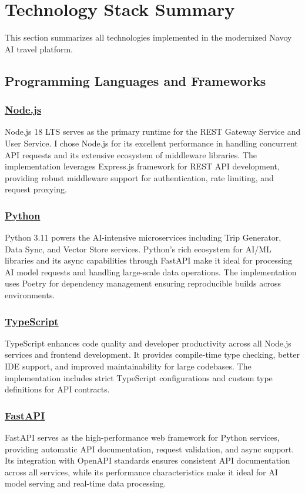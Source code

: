 \section{Technology Stack Summary}
This section summarizes all technologies implemented in the modernized Navoy AI travel platform.

\subsection{Programming Languages and Frameworks}

\subsubsection*{\underline{Node.js}}
Node.js 18 LTS serves as the primary runtime for the REST Gateway Service and User Service. I chose Node.js for its excellent performance in handling concurrent API requests and its extensive ecosystem of middleware libraries. The implementation leverages Express.js framework for REST API development, providing robust middleware support for authentication, rate limiting, and request proxying.

\subsubsection*{\underline{Python}}
Python 3.11 powers the AI-intensive microservices including Trip Generator, Data Sync, and Vector Store services. Python's rich ecosystem for AI/ML libraries and its async capabilities through FastAPI make it ideal for processing AI model requests and handling large-scale data operations. The implementation uses Poetry for dependency management ensuring reproducible builds across environments.

\subsubsection*{\underline{TypeScript}}
TypeScript enhances code quality and developer productivity across all Node.js services and frontend development. It provides compile-time type checking, better IDE support, and improved maintainability for large codebases. The implementation includes strict TypeScript configurations and custom type definitions for API contracts.

\subsubsection*{\underline{FastAPI}}
FastAPI serves as the high-performance web framework for Python services, providing automatic API documentation, request validation, and async support. Its integration with OpenAPI standards ensures consistent API documentation across all services, while its performance characteristics make it ideal for AI model serving and real-time data processing.

